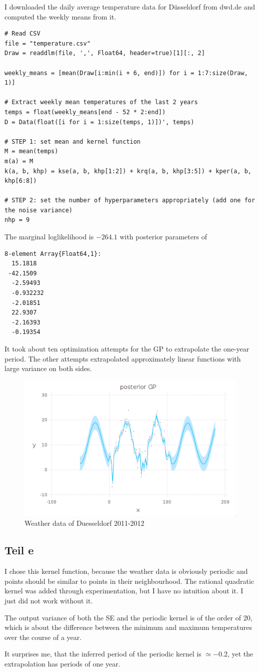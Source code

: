 \documentclass[10pt,a4paper]{article}
\begin{document}
I downloaded the daily average temperature data for Düsseldorf from dwd.de and
computed the weekly means from it.
\begin{verbatim}
# Read CSV
file = "temperature.csv"
Draw = readdlm(file, ',', Float64, header=true)[1][:, 2]

weekly_means = [mean(Draw[i:min(i + 6, end)]) for i = 1:7:size(Draw, 1)]

# Extract weekly mean temperatures of the last 2 years
temps = float(weekly_means[end - 52 * 2:end])
D = Data(float([i for i = 1:size(temps, 1)])', temps)

# STEP 1: set mean and kernel function
M = mean(temps)
m(a) = M
k(a, b, khp) = kse(a, b, khp[1:2]) + krq(a, b, khp[3:5]) + kper(a, b, khp[6:8])

# STEP 2: set the number of hyperparameters appropriately (add one for the noise variance)
nhp = 9
\end{verbatim}
The marginal loglikelihood is $-264.1$ with posterior parameters of
\begin{verbatim}
8-element Array{Float64,1}:
  15.1818
 -42.1509
  -2.59493
  -0.932232
  -2.01851
  22.9307
  -2.16393
  -0.19354
\end{verbatim}
It took about ten optimization attempts for the GP to extrapolate the one-year
period. The other attempts extrapolated approximately linear functions with
large variance on both sides.
\begin{figure}[h]
  \centering
  \includegraphics[width=350pt]{11_2}
  \caption{Weather data of Duesseldorf 2011-2012}
\end{figure}

\subsection{Teil e}

I chose this kernel function, because the weather data is obviously periodic and
points should be similar to points in their neighbourhood. The rational
quadratic kernel was added through experimentation, but I have no intuition
about it. I just did not work without it.

The output variance of both the SE and the periodic kernel is of the order of
20, which is about the difference between the minimum and maximum temperatures
over the course of a year.

It surprises me, that the inferred period of the periodic kernel is
$\simeq -0.2$, yet the extrapolation has periods of one year.
\end{document}
